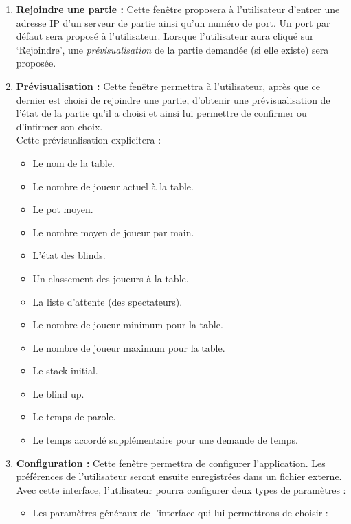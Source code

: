 \begin{enumerate}
	\item \textbf{Rejoindre une partie :} Cette fenêtre proposera à l'utilisateur
	      d'entrer une adresse IP d'un serveur de partie ainsi qu'un numéro de 
	      port. Un port par défaut sera proposé à l'utilisateur. Lorsque 
	      l'utilisateur aura cliqué sur `Rejoindre', une 
	      \textit{prévisualisation} de la partie demandée (si elle existe) sera 
	      proposée.
	
	\item \textbf{Prévisualisation :} Cette fenêtre permettra à l'utilisateur, 
	       après que ce dernier est choisi de rejoindre une partie, d'obtenir 
	       une prévisualisation de l'état de la partie qu'il a choisi et ainsi 
	       lui permettre de confirmer ou d'infirmer son choix.\\
	Cette prévisualisation explicitera :

	\begin{itemize}
		\item Le nom de la table.
		\item Le nombre de joueur actuel à la table.
		\item Le pot moyen.
		\item Le nombre moyen de joueur par main.
		\item L'état des blinds.
		\item Un classement des joueurs à la table.
		\item La liste d'attente (des spectateurs).
		\item Le nombre de joueur minimum pour la table.
		\item Le nombre de joueur maximum pour la table.
		\item Le stack initial.
		\item Le blind up.
		\item Le temps de parole.
		\item Le temps accordé supplémentaire pour une demande de temps.
 		\end{itemize} 

		\item \textbf{Configuration :} Cette fenêtre permettra de configurer 
		      l'application. Les préférences de l'utilisateur seront ensuite 
		      enregistrées dans un fichier externe. Avec cette interface, 
		      l'utilisateur pourra configurer deux types de paramètres :

		\begin{itemize}
			\item Les paramètres généraux de l'interface qui lui permettrons 
			      de choisir :


\end{itemize}
\end{enumerate}
